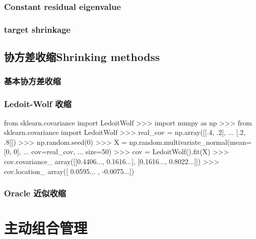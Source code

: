 \documentclass{scrartcl}
\numberwithin{equation}{section}
\begin{document}
\subsubsection{Constant residual eigenvalue}
\subsubsection{target shrinkage}
\subsection{协方差收缩Shrinking methodss}
\subsubsection{基本协方差收缩}
\subsubsection{Ledoit-Wolf 收缩}
\begin{python}
    from sklearn.covariance import LedoitWolf
    >>> import numpy as np
    >>> from sklearn.covariance import LedoitWolf
    >>> real_cov = np.array([[.4, .2],
            ...                      [.2, .8]])
    >>> np.random.seed(0)
    >>> X = np.random.multivariate_normal(mean=[0, 0],
    ...                                   cov=real_cov,
    ...                                   size=50)
    >>> cov = LedoitWolf().fit(X)
    >>> cov.covariance_
    array([[0.4406..., 0.1616...],
            [0.1616..., 0.8022...]])
    >>> cov.location_
    array([ 0.0595... , -0.0075...])
\end{python}
\subsubsection{Oracle 近似收缩}
\newpage

\section{主动组合管理}
\end{document}
